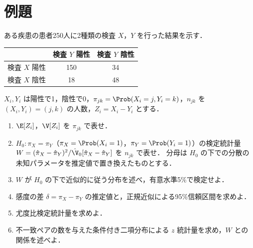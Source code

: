 \section{例題}\label{sec:m06-reidai}
\begin{reidai}\label{reidai:m06-1}
ある疾患の患者250人に2種類の検査 $X$，$Y$ を行った結果を示す．
\begin{center}\small
\begin{tabular}{@{}lcc@{}}
\toprule
 & 検査 $Y$ 陽性 & 検査 $Y$ 陰性\\
\midrule
検査 $X$ 陽性 & 150 & 34\\
検査 $X$ 陰性 & 18 & 48\\
\bottomrule
\end{tabular}
\end{center}
$X_i,Y_i$ は陽性で1，陰性で0，$\pi_{jk}=\Prob(X_i=j,Y_i=k)$，$n_{jk}$ を $(X_i,Y_i)=(j,k)$ の人数，$Z_i=X_i-Y_i$ とする．
\begin{enumerate}[label=〔\arabic*〕]
\item $\E[Z_i]$，$\V[Z_i]$ を $\pi_{jk}$ で表せ．
\item $H_0:\pi_X=\pi_Y$（$\pi_X=\Prob(X_i=1)$，$\pi_Y=\Prob(Y_i=1)$）の検定統計量 $W=(\hat\pi_X-\hat\pi_Y)^2/\hat\V_0[\hat\pi_X-\hat\pi_Y]$ を $n_{jk}$ で表せ．
      分母は $H_0$ の下での分散の未知パラメータを推定値で置き換えたものとする．
\item $W$ が $H_0$ の下で近似的に従う分布を述べ，有意水準5\%で検定せよ．
\item 感度の差 $\delta=\pi_X-\pi_Y$ の推定値と，正規近似による95\%信頼区間を求めよ．
\item 尤度比検定統計量を求めよ．
\item 不一致ペアの数を与えた条件付き二項分布による $z$ 統計量を求め，$W$ との関係を述べよ．
\end{enumerate}
\end{reidai}

